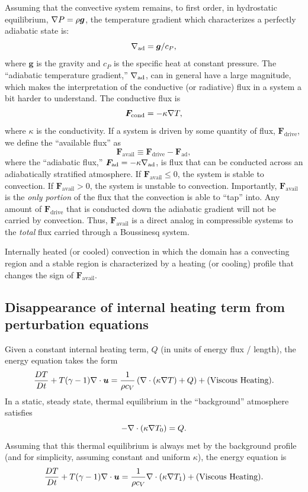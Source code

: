 Assuming that the convective system remains, to first order, in hydrostatic equilibrium, $\nabla P = \rho \bm{g}$, the temperature gradient which characterizes a perfectly adiabatic state is:
\begin{equation}
\nabla_{\text{ad}} = \bm{g}/c_P,
\end{equation}
where $\bm{g}$ is the gravity and $c_P$ is the specific heat at constant pressure.
The ``adiabatic temperature gradient,'' $\nabla_{\text{ad}}$, can in general have a large magnitude, which makes the interpretation of the conductive (or radiative) flux in a system a bit harder to understand.
The conductive flux is
\begin{equation}
\bm{F}_{\text{cond}} = -\kappa \nabla T,
\end{equation}
where $\kappa$ is the conductivity.
If a system is driven by some quantity of flux, $\bm{F}_{\text{drive}}$, we define the ``available flux'' as
\begin{equation}
\bm{F}_{\text{avail}} \equiv \bm{F}_{\text{drive}} - \bm{F}_{\text{ad}},
\end{equation}
where the ``adiabatic flux,'' $\bm{F}_{\text{ad}} = -\kappa\nabla_{\text{ad}}$, is flux that can be conducted across an adiabatically stratified atmosphere.
If $\bm{F}_{\text{avail}} \leq 0$, the system is stable to convection.
If $\bm{F}_{\text{avail}} > 0$, the system is unstable to convection.
Importantly, $\bm{F}_{\text{avail}}$ is the \emph{only portion} of the flux that the convection is able to ``tap'' into.
Any amount of $\bm{F}_{\text{drive}}$ that is conducted down the adiabatic gradient will not be carried by convection.
Thus, $\bm{F}_{\text{avail}}$ is a direct analog in compressible systems to the \emph{total} flux carried through a Boussinesq system.

Internally heated (or cooled) convection in which the domain has a convecting region and a stable region is characterized by a heating (or cooling) profile that changes the sign of $\bm{F}_{\text{avail}}$.

\subsection{Disappearance of internal heating term from perturbation equations}
Given a constant internal heating term, $Q$ (in units of energy flux / length), the energy equation takes the form
\begin{equation}
\frac{D T}{Dt} + T(\gamma-1)\nabla\cdot\bm{u} = \frac{1}{\rho c_V}\left(\nabla\cdot\left( \kappa \nabla T\right) + Q\right) + \text{(Viscous Heating)}.
\end{equation}
In a static, steady state, thermal equilibrium in the ``background'' atmosphere satisfies 
\begin{equation}
-\nabla\cdot\left( \kappa \nabla T_0\right) = Q.
\end{equation}
Assuming that this thermal equilibrium is always met by the background profile (and for simplicity, assuming constant and uniform $\kappa$), the energy equation is
\begin{equation}
\frac{D T}{Dt} + T(\gamma-1)\nabla\cdot\bm{u} = \frac{1}{\rho c_V}\nabla\cdot\left( \kappa \nabla T_1\right) + \text{(Viscous Heating)}.
\end{equation}

